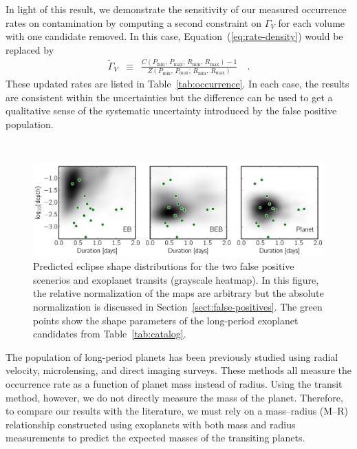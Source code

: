 \documentclass[manuscript, letterpaper]{aastex6}
\makeatletter
\let\origsection\section
\renewcommand\section{\@ifstar{\starsection}{\nostarsection}}
\newcommand\nostarsection[1]{\sectionprelude\origsection{#1}}
\newcommand\starsection[1]{\sectionprelude\origsection*{#1}}
\newcommand\sectionprelude{\vspace{1em}}
\newcommand{\dfmfiglabel}[1]{\label{fig:#1}}
\renewcommand{\eqref}[1]{\ref{eq:#1}}
\newcommand{\Eq}[1]{Equation~(\eqref{#1})}
\newcommand{\eq}[1]{\Eq{#1}}
\newcommand{\eqlabel}[1]{\label{eq:#1}}
\newcommand{\sectionname}{Section}
\newcommand{\sectref}[1]{\ref{sect:#1}}
\newcommand{\Sect}[1]{\sectionname~\sectref{#1}}
\newcommand{\sect}[1]{\Sect{#1}}
\newcommand{\sectlabel}[1]{\label{sect:#1}}
\makeatother
\begin{document}
In light of this result, we demonstrate the sensitivity of our measured
occurrence rates on contamination by computing a second constraint on
$\Gamma_V$ for each volume with one candidate removed.
In this case, \eq{rate-density} would be replaced by
\begin{eqnarray}\eqlabel{rate-minus}
\tilde{\Gamma}_V &\equiv&
    \frac{C(P_\mathrm{min},\,P_\mathrm{max};\,R_\mathrm{min},\,R_\mathrm{max})
          - 1}
         {Z(P_\mathrm{min},\,P_\mathrm{max};\,R_\mathrm{min},\,R_\mathrm{max})}
\quad.
\end{eqnarray}
These updated rates are listed in Table~\ref{tab:occurrence}.
In each case, the results are consistent within the uncertainties but the
difference can be used to get a qualitative sense of the systematic
uncertainty introduced by the false positive population.


\begin{figure}[htbp]~\\
\begin{center}
\includegraphics[width=\textwidth]{../prediction/shape_kdes.pdf}
\end{center}
\caption{%
Predicted eclipse shape distributions for the two false positive scenerios and
exoplanet transits (grayscale heatmap).
In this figure, the relative normalization of the maps are arbitrary but the
absolute normalization is discussed in \sect{false-positives}.
The green points show the shape parameters of the long-period exoplanet
candidates from Table~\ref{tab:catalog}.
\dfmfiglabel{shape-kdes}}
\end{figure}


\section{Comparison with the literature}\sectlabel{comparison}

The population of long-period planets has been previously studied using radial
velocity, microlensing, and direct imaging surveys.
These methods all measure the occurrence rate as a function of planet mass
instead of radius.
Using the transit method, however, we do not directly measure the mass of the
planet.
Therefore, to compare our results with the literature, we must rely on a
mass--radius (M--R) relationship constructed using exoplanets with both mass
and radius measurements \citep[for example][]{Weiss:2014, Wolfgang:2016,
Chen:2016} to predict the expected masses of the transiting planets.
\end{document}

